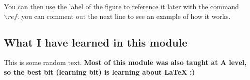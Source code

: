 You can then use the label of the figure to reference it later with the command ${\backslash}ref$. you can comment out the next line to see an example of how it works.


\subsection{What I have learned in this module}
This is some random text.
\textbf{Most of this module was also taught at A level, so the best bit (learning bit) is learning about LaTeX :)}

